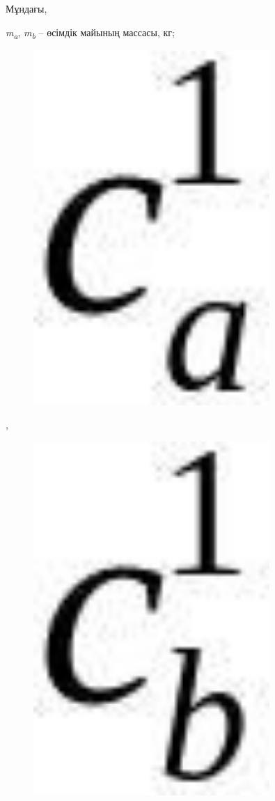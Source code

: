 Мұндағы,

\emph{m\textsubscript{a}}, \emph{m\textsubscript{b}} -- өсімдік майының
массасы, кг;

\begin{figure}[H]
	\centering
	\includegraphics[width=0.8\textwidth]{assets/1101}
	\caption*{}
\end{figure}, \begin{figure}[H]
	\centering
	\includegraphics[width=0.8\textwidth]{assets/1102}

\end{figure}
